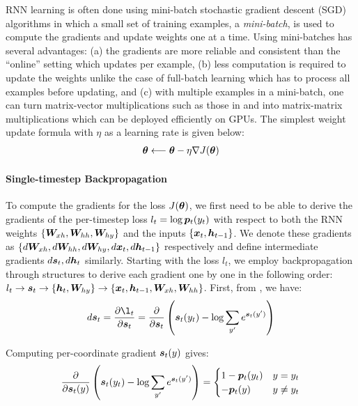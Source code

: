 RNN learning is often done using mini-batch stochastic gradient descent (SGD) algorithms in
which a small set of training examples, a {\it mini-batch}, is used to compute
the gradients and update weights one at a time. Using mini-batches has
several advantages: (a) the gradients are more reliable and consistent than the
``online'' setting which updates per example, (b) less computation is required to
update the weights unlike the case of full-batch learning which has to process
all examples before updating, and (c) with multiple examples in a mini-batch,
one can turn matrix-vector multiplications such
as those in  and  into matrix-matrix multiplications which can be
deployed efficiently on GPUs. The simplest weight update formula with $\eta$ as
a learning rate is given below:
\begin{align}
\thetav \longleftarrow \thetav - \eta \grad{J(\thetav)} %
\end{align}

\paragraph{Single-timestep Backpropagation} To compute the gradients for the loss $J(\bm{\theta})$,
we first need to be able to derive the gradients of the per-timestep loss $l_t
=\log \bm{p}_{t}(y_t)$ with respect to both the RNN weights
$\{\bm{W}_{xh}, \bm{W}_{hh}, \bm{W}_{hy}\}$ and the inputs $\{\bm{x}_{t}, \bm{h}_{t-1}\}$. We denote
these gradients as $\{d\bm{W}_{xh}, d\bm{W}_{hh}, d\bm{W}_{hy}, d\bm{x}_{t}, d\bm{h}_{t-1}\}$
respectively and define intermediate gradients $d\bm{s}_{t}, d\bm{h}_{t}$ similarly. 
Starting with the loss $l_t$, we employ backpropagation through structures
\cite{goller:ieeenn00} to derive each gradient one by one in the following
order: $l_t \rightarrow \bm{s}_{t} \rightarrow \{\bm{h}_{t}, \bm{W}_{hy}\} \rightarrow
\{\bm{x}_{t}, \bm{h}_{t-1}, \bm{W}_{xh}, \bm{W}_{hh}\}$.
First, from , we have:
\begin{align}
d\s{t} = \fracder{\l_t}{\s{t}} = \parfrac{\s{t}} \paren{\s{t}(y_t) - \log \sum_{y'}
e^{\s{t}(y')}}
\end{align}

Computing per-coordinate gradient $\bm{s}_{t}(y)$ gives:
\begin{align}
 \frac{\partial}{\partial \bm{s}_{t}(y)} \left(\bm{s}_{t}(y_t) - \log \sum_{y'} e^{\bm{s}_{t}(y')}\right) =
  \begin{cases}
   1 - \bm{p}_{t}(y_t) & y = y_t \\
   -\bm{p}_{t}(y) & y \neq y_t
  \end{cases}
\end{align}

